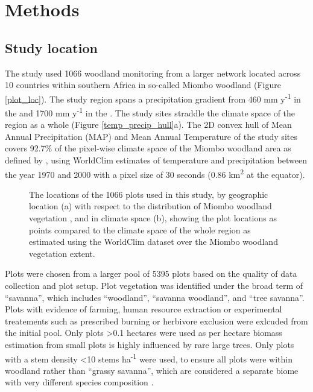 \documentclass[11pt,a4paper]{article}
\begin{document}
\section{Methods}

\subsection{Study location}

The study used 1066 woodland monitoring from a larger network located across 10 countries within southern Africa in so-called Miombo woodland (Figure \ref{plot_loc}). The study region spans a precipitation gradient from \textapprox{}460 mm y\textsuperscript{-1} in the  and \textapprox{}1700 mm y\textsuperscript{-1} in the . The study sites straddle the climate space of the region as a whole (Figure \ref{temp_precip_hull}a). The 2D convex hull of Mean Annual Precipitation (MAP) and Mean Annual Temperature of the study sites covers 92.7\% of the pixel-wise climate space of the Miombo woodland area as defined by \citet{White}, using WorldClim estimates of temperature and precipitation between the year 1970 and 2000 with a pixel size of 30 seconds (0.86 km\textsuperscript{2} at the equator). 

\begin{figure}[H]
	\centering
    \qquad
    \caption{The locations of the 1066 plots used in this study, by geographic location (a) with respect to the distribution of Miombo woodland vegetation \citep{White}, and in climate space (b), showing the plot locations as points compared to the climate space of the whole region as estimated using the WorldClim dataset over the Miombo woodland vegetation extent.}
\end{figure}

Plots were chosen from a larger pool of 5395 plots based on the quality of data collection and plot setup. Plot vegetation was identified under the broad term of ``savanna'', which includes ``woodland'', ``savanna woodland'', and ``tree savanna''. Plots with evidence of farming, human resource extraction or experimental treatements such as prescribed burning or herbivore exclusion were exlcuded from the initial pool. Only plots \textgreater{}0.1 hectares were used as per hectare biomass estimation from small plots is highly influenced by rare large trees. Only plots with a stem density \textless{}10 stems ha\textsuperscript{-1} were used, to ensure all plots were within woodland rather than ``grassy savanna'', which are considered a separate biome with very different species composition \citep{Parr2014}.
\end{document}
